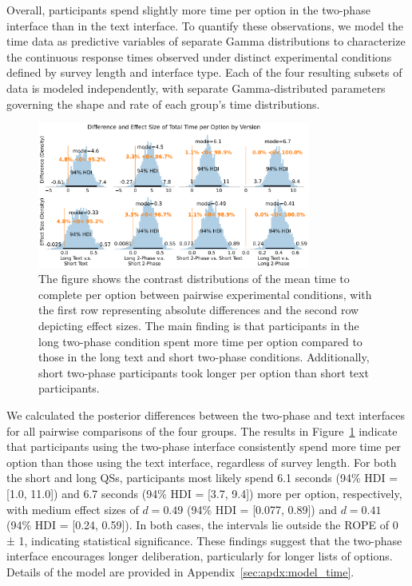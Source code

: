 Overall, participants spend slightly more time per option in the two-phase interface than in the text interface. To quantify these observations, we model the time data as predictive variables of separate Gamma distributions to characterize the continuous response times observed under distinct experimental conditions defined by survey length and interface type. Each of the four resulting subsets of data is modeled independently, with separate Gamma-distributed parameters governing the shape and rate of each group's time distributions. 

\begin{figure}[h]
    \centering
    \includegraphics[width=0.8\textwidth]{content/image/time/time_diff_per_option_effect_size_by_version}
    \captionsetup{width=0.9\textwidth, justification=justified}
    \caption{The figure shows the contrast distributions of the mean time to complete per option between pairwise experimental conditions, with the first row representing absolute differences and the second row depicting effect sizes. The main finding is that participants in the long two-phase condition spent more time per option compared to those in the long text and short two-phase conditions. Additionally, short two-phase participants took longer per option than short text participants.}
    \label{fig:time_per_option_bayesian}
\end{figure}

We calculated the posterior differences between the two-phase and text interfaces for all pairwise comparisons of the four groups. The results in Figure~\ref{fig:time_per_option_bayesian} indicate that participants using the two-phase interface consistently spend more time per option than those using the text interface, regardless of survey length. For both the short and long QSs, participants most likely spend 6.1 seconds (94\% HDI = [1.0, 11.0]) and 6.7 seconds (94\% HDI = [3.7, 9.4]) more per option, respectively, with medium effect sizes of $d=0.49$ (94\% HDI = [0.077, 0.89]) and $d=0.41$ (94\% HDI = [0.24, 0.59]). In both cases, the intervals lie outside the ROPE of 0 ± 1, indicating statistical significance. These findings suggest that the two-phase interface encourages longer deliberation, particularly for longer lists of options. Details of the model are provided in Appendix~\ref{sec:apdx:model_time}.

